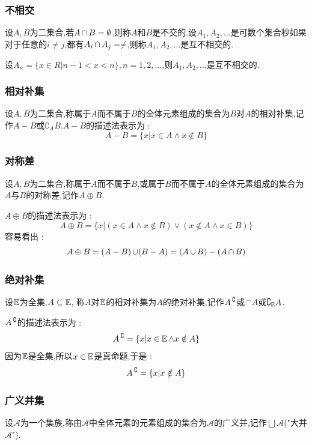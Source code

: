 {{\subsubsection{不相交}{
  设$A,B$为二集合,若$A \operatorname{\cap} B = \emptyset$,则称$A$和$B$是不交的.设$A_1,A_2,\dots$是可数个集合秒如果对于任意的$i \neq j$,都有$A_i \operatorname{\cap} A_j = \neq$,则称$A_1,A_2,\dots$是互不相交的.

  设$A_n = \{x \in R | n - 1 < x < n\},n = 1,2,\dots$,则$A_1,A_2,\dots$是互不相交的.
}%

\subsubsection{相对补集}{
  设$A,B$为二集合,称属于$A$而不属于$B$的全体元素组成的集合为$B$对$A$的相对补集,记作$A - B$或$\complement_A B$.$A - B$的描述法表示为 : $$
    A - B = \{x | x \in A \land x \notin B\}
  $$
}%

\subsubsection{对称差}{
  设$A,B$为二集合,称属于$A$而不属于$B$,或属于$B$而不属于$A$的全体元素组成的集合为$A$与$B$的对称差,记作$A \oplus B$.

  $A \oplus B$的描述法表示为 : $$
    A \oplus B = \{x | (x \in A \land x \notin B) \lor (x \notin A \land x \in B)\}
  $$
  容易看出 : $$
    A \oplus B = (A - B) \operatorname{\cup} (B - A) = (A \operatorname{\cup} B) - (A \operatorname{\cap} B)
  $$
}%

\subsubsection{绝对补集}{
  设$\operatorname{\mathbb{E}}$为全集,$A \subseteq \operatorname{\mathbb{E}}$, 称$A$对$\operatorname{\mathbb{E}}$的相对补集为$A$的绝对补集,记作$A\operatorname{^\complement}$或${~}^\sim A$或$\complement_{\operatorname{\mathbb{E}}} A$.

  $A\operatorname{^\complement}$的描述法表示为 : $$
    A\operatorname{^\complement} = \{x | x \in \operatorname{\mathbb{E}} \land x \notin A\}
  $$
  因为$\operatorname{\mathbb{E}}$是全集,所以$x \in \operatorname{\mathbb{E}}$是真命题,于是 : $$
    A\operatorname{^\complement} = \{x | x \notin A\}
  $$
}%

\subsubsection{广义并集}{
  设$\mathcal{A}$为一个集族,称由$\mathcal{A}$中全体元素的元素组成的集合为$\mathcal{A}$的广义并,记作$\bigcup \mathcal{A}$("大并$\mathcal{A}$").

}}}
